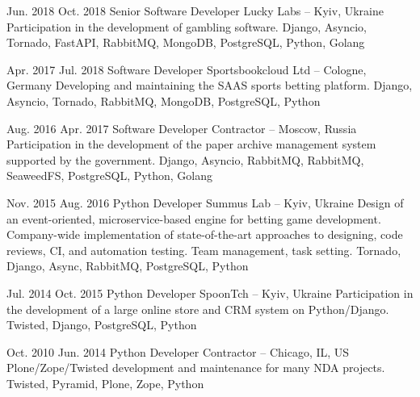 \documentclass[a4paper]{mcresume}
\begin{document}
{\begin{twenty}
    \workitem
    {Jun. 2018}
    {Oct. 2018}
    {Senior Software Developer}
    {Lucky Labs -- Kyiv, Ukraine}
    {\onsite}
    {Participation in the development of gambling software.}
    {Django, Asyncio, Tornado, FastAPI, RabbitMQ, MongoDB, PostgreSQL, Python, Golang}

    \workitem
    {Apr. 2017}
    {Jul. 2018}
    {Software Developer}
    {Sportsbookcloud Ltd -- Cologne, Germany}
    {\remote}
    {Developing and maintaining the SAAS sports betting platform.}
    {Django, Asyncio, Tornado, RabbitMQ, MongoDB, PostgreSQL, Python}

    \workitem
    {Aug. 2016}
    {Apr. 2017}
    {Software Developer}
    {Contractor -- Moscow, Russia}
    {\remote}
    {Participation in the development of the paper archive management system supported by the government.}
    {Django, Asyncio, RabbitMQ, RabbitMQ, SeaweedFS, PostgreSQL, Python, Golang}

    \workitem
    {Nov. 2015}
    {Aug. 2016}
    {Python Developer}
    {Summus Lab -- Kyiv, Ukraine}
    {\onsite}
    {Design of an event-oriented, microservice-based engine for betting game development.
    Company-wide implementation of state-of-the-art approaches to designing, code reviews, CI, and automation testing.
    Team management, task setting.}
    {Tornado, Django, Async, RabbitMQ, PostgreSQL, Python}
    {\small}

    \workitem
    {Jul. 2014}
    {Oct. 2015}
    {Python Developer}
    {SpoonTch -- Kyiv, Ukraine}
    {\remote}
    {Participation in the development of a large online store and CRM system on Python/Django.}
    {Twisted, Django, PostgreSQL, Python}
    {\small}


    \workitem
    {Oct. 2010}
    {Jun. 2014}
    {Python Developer}
    {Contractor -- Chicago, IL, US}
    {\remote}
    {Plone/Zope/Twisted development and maintenance for many NDA projects.}
    {Twisted, Pyramid, Plone, Zope, Python}

    \end{twenty}

}
\end{document}

